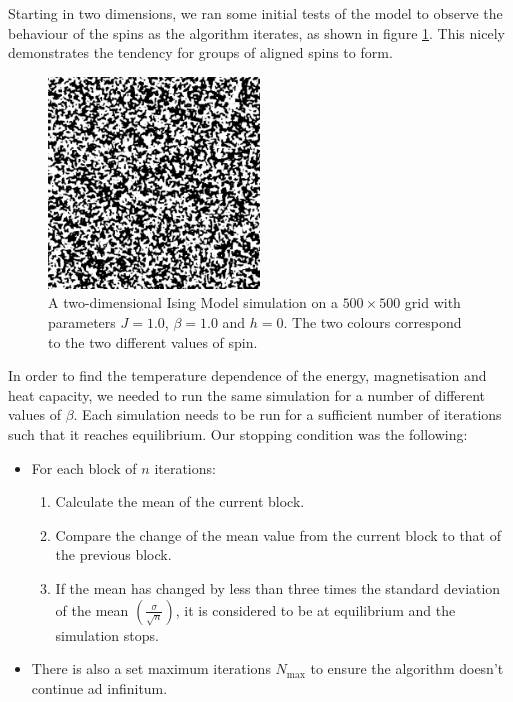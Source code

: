 \documentclass[11pt]{article}
\begin{document}
	Starting in two dimensions, we ran some initial tests of the model to observe the behaviour of the spins as the algorithm iterates, as shown in figure \ref{fig:ising_grid}. This nicely demonstrates the tendency for groups of aligned spins to form.
	\begin{figure}[H]
		\begin{center}
			\includegraphics[width=0.5\textwidth]{./img/ising-simulation.png}
		\end{center}
		\caption{A two-dimensional Ising Model simulation on a $500\times 500$ grid with parameters $J = 1.0$, $\beta = 1.0$ and $h = 0$. The two colours correspond to the two different values of spin.}
		\label{fig:ising_grid}
	\end{figure}
	
	In order to find the temperature dependence of the energy, magnetisation and heat capacity, we needed to run the same simulation for a number of different values of $\beta$. Each simulation needs to be run for a sufficient number of iterations such that it reaches equilibrium. Our stopping condition was the following:
	\begin{itemize}
		\item For each block of $n$ iterations:
		\begin{enumerate}
			\item Calculate the mean of the current block.
			\item Compare the change of the mean value from the current block to that of the previous block.
			\item If the mean has changed by less than three times the standard deviation of the mean $\displaystyle\left(\frac{\sigma}{\sqrt{n}}\right)$, it is considered to be at equilibrium and the simulation stops.
		\end{enumerate}
		\item There is also a set maximum iterations $N_\text{max}$ to ensure the algorithm doesn't continue ad infinitum.
	\end{itemize}
	
\end{document}
